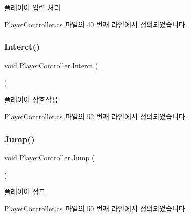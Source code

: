 플레이어 입력 처리 



Player\+Controller.\+cs 파일의 40 번째 라인에서 정의되었습니다.


\begin{DoxyCode}{0}

\end{DoxyCode}
\mbox{\label{class_player_controller_ad27e790d9d27a02b497c41f668f1dc25}} 
\subsubsection{\texorpdfstring{Interct()}{Interct()}}
{\footnotesize\ttfamily void Player\+Controller.\+Interct (\begin{DoxyParamCaption}{ }\end{DoxyParamCaption})}



플레이어 상호작용 



Player\+Controller.\+cs 파일의 52 번째 라인에서 정의되었습니다.


\begin{DoxyCode}{0}

\end{DoxyCode}
\mbox{\label{class_player_controller_a8a7010cb6f3c524737be3f6f77553df9}} 
\subsubsection{\texorpdfstring{Jump()}{Jump()}}
{\footnotesize\ttfamily void Player\+Controller.\+Jump (\begin{DoxyParamCaption}{ }\end{DoxyParamCaption})}



플레이어 점프 



Player\+Controller.\+cs 파일의 50 번째 라인에서 정의되었습니다.


\begin{DoxyCode}{0}

\end{DoxyCode}
\mbox{\label{class_player_controller_a79dff0e97fa69f5f3660d65c2a32be39}} 
